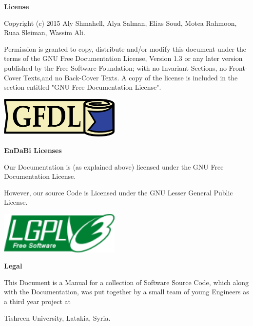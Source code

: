 \documentclass{slides}
\begin{document}
\newpage
\begin{center} 
\textbf{\Large License}
\end{center}
\begin{center}
 Copyright (c)  2015  Aly Shmahell, Alya Salman, Elias Soud, Motea Rahmoon, Ruaa Sleiman, Wassim Ali. 
 \end{center}
\begin{center} 
Permission is granted to copy, distribute and/or modify this document
under the terms of the GNU Free Documentation License, Version 1.3
or any later version published by the Free Software Foundation; with no Invariant Sections, no Front-Cover Texts,and no Back-Cover Texts.
A copy of the license is included in the section entitled "GNU Free Documentation License".
\newline
\end{center}
\begin{center}
\includegraphics[totalheight=20mm,width=60mm]{gfdl-logo-med.png}
\end{center}
\newpage

\newpage
\begin{center}
\textbf{\Large EnDaBi Licenses}
\end{center}
\begin{center}
Our Documentation is (as explained above) licensed under the GNU Free Documentation License.
\end{center}
\begin{center}
However, our source Code is Licensed under the GNU Lesser General Public License.
\end{center}
\begin{center}
\includegraphics[totalheight=20mm,width=60mm]{lgplv3-147x51.png}
\end{center}
\newpage
 \begin{center} \textbf{\Large Legal} \end{center}
  \begin{center}
  \begin{normalsize}
  This Document is a Manual for a collection of Software Source Code, which along with the Documentation, was put together by a small team of young Engineers as a third year project at  
  \end{normalsize}
  \end{center} 
  \begin{center}
  Tishreen University, Latakia, Syria.
  
  \end{center} 
 
\end{document}
